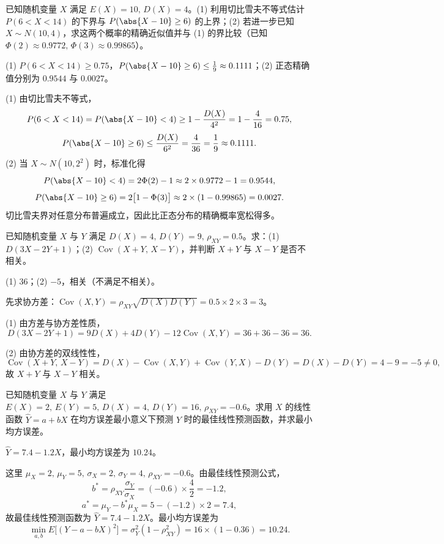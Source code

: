 \begin{exercise}
已知随机变量 $X$ 满足 $E(X)=10,\,D(X)=4$。(1) 利用切比雪夫不等式估计 $P(6<X<14)$ 的下界与 $P(\abs{X-10}\ge 6)$ 的上界；(2) 若进一步已知 $X\sim N(10,4)$，求这两个概率的精确近似值并与 (1) 的界比较（已知 $\Phi(2)\approx 0.9772,\,\Phi(3)\approx 0.99865$）。
\begin{answer}
(1) $P(6<X<14)\ge 0.75$，$P(\abs{X-10}\ge 6)\le\frac{1}{9}\approx 0.1111$；(2) 正态精确值分别为 $0.9544$ 与 $0.0027$。
\end{answer}
\begin{solution}
(1) 由切比雪夫不等式，
\[
  P(6<X<14)=P(\abs{X-10}<4)\ge 1-\frac{D(X)}{4^2}=1-\frac{4}{16}=0.75,
\]
\[
  P(\abs{X-10}\ge 6)\le\frac{D(X)}{6^2}=\frac{4}{36}=\frac{1}{9}\approx 0.1111.
\]
(2) 当 $X\sim N(10,2^2)$ 时，标准化得
\[
  P(\abs{X-10}<4)=2\Phi(2)-1\approx 2\times 0.9772-1=0.9544,
\]
\[
  P(\abs{X-10}\ge 6)=2\bigl[1-\Phi(3)\bigr]\approx 2\times(1-0.99865)=0.0027.
\]
切比雪夫界对任意分布普遍成立，因此比正态分布的精确概率宽松得多。
\end{solution}
\end{exercise}

\begin{exercise}
已知随机变量 $X$ 与 $Y$ 满足 $D(X)=4,\,D(Y)=9,\,\rho_{XY}=0.5$。求：(1) $D(3X-2Y+1)$；(2) $\operatorname{Cov}(X+Y,\,X-Y)$，并判断 $X+Y$ 与 $X-Y$ 是否不相关。
\begin{answer}
(1) $36$；(2) $-5$，相关（不满足不相关）。
\end{answer}
\begin{solution}
先求协方差：$\operatorname{Cov}(X,Y)=\rho_{XY}\sqrt{D(X)D(Y)}=0.5\times 2\times 3=3$。

(1) 由方差与协方差性质，
\[
  D(3X-2Y+1)=9D(X)+4D(Y)-12\operatorname{Cov}(X,Y)=36+36-36=36.
\]

(2) 由协方差的双线性性，
\[
  \operatorname{Cov}(X+Y,\,X-Y)=D(X)-\operatorname{Cov}(X,Y)+\operatorname{Cov}(Y,X)-D(Y)=D(X)-D(Y)=4-9=-5\ne 0,
\]
故 $X+Y$ 与 $X-Y$ 相关。
\end{solution}
\end{exercise}

\begin{exercise}
已知随机变量 $X$ 与 $Y$ 满足 $E(X)=2,\,E(Y)=5,\,D(X)=4,\,D(Y)=16,\,\rho_{XY}=-0.6$。求用 $X$ 的线性函数 $\hat{Y}=a+bX$ 在均方误差最小意义下预测 $Y$ 时的最佳线性预测函数，并求最小均方误差。
\begin{answer}
$\hat{Y}=7.4-1.2X$，最小均方误差为 $10.24$。
\end{answer}
\begin{solution}
这里 $\mu_X=2,\,\mu_Y=5,\,\sigma_X=2,\,\sigma_Y=4,\,\rho_{XY}=-0.6$。由最佳线性预测公式，
\[
  b^*=\rho_{XY}\frac{\sigma_Y}{\sigma_X}=(-0.6)\times\frac{4}{2}=-1.2,
\]
\[
  a^*=\mu_Y-b^*\mu_X=5-(-1.2)\times 2=7.4,
\]
故最佳线性预测函数为 $\hat{Y}=7.4-1.2X$。最小均方误差为
\[
  \min_{a,b}E\bigl[(Y-a-bX)^2\bigr]=\sigma_Y^2(1-\rho_{XY}^2)=16\times(1-0.36)=10.24.
\]
\end{solution}
\end{exercise}

